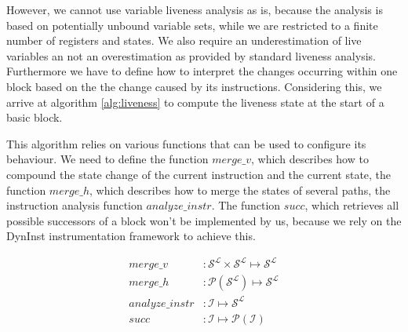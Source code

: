 However, we cannot use variable liveness analysis as is, because the analysis is based on potentially unbound variable sets, while we are restricted to a finite number of registers and states. We also require an underestimation of live variables an not an overestimation as provided by standard liveness analysis. Furthermore we have to define how to interpret the changes occurring within one block based on the the change caused by its instructions. Considering this, we arrive at algorithm \ref{alg:liveness} to compute the liveness state at the start of a basic block.

This algorithm relies on various functions that can be used to configure its behaviour. We need to define the function $merge\_v$, which describes how to compound the state change of the current instruction and the current state, the function $merge\_h$, which describes how to merge the states of several paths, the instruction analysis function $analyze\_instr$. The function $succ$, which retrieves all possible successors of a block won't be implemented by us, because we rely on the DynInst instrumentation framework to achieve this.

\begin{subequations}
\label{eq:livenesscustom}
\begin{align}
merge\_v &: \mathcal{S}^\mathcal{L} \times \mathcal{S}^\mathcal{L} \mapsto \mathcal{S}^\mathcal{L}\\
merge\_h &: \mathcal{P}(\mathcal{S}^\mathcal{L}) \mapsto \mathcal{S}^\mathcal{L}\\
analyze\_instr &: \mathcal {I} \mapsto \mathcal{S}^\mathcal{L} \\
succ &: \mathcal{I} \mapsto \mathcal{P}(\mathcal{I})
\end{align}
\end{subequations}

